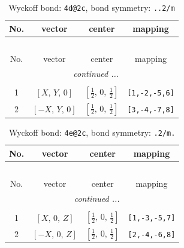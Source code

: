\documentclass[fleqn,8pt]{jsarticle}
\begin{document}
\begin{longtable}{cccc}
\caption{Wyckoff bond: {\tt 4d@2c}, bond symmetry: {\tt ..2/m}}
 \\
 \hline \hline
No. & vector & center & mapping \\ \hline \endfirsthead

\multicolumn{3}{l}{\tablename\ \thetable{}} \\
 \hline \hline
No. & vector & center & mapping \\ \hline \endhead

 \hline \hline
\multicolumn{3}{r}{\footnotesize\it continued ...} \\ \endfoot

 \hline \hline
\multicolumn{3}{r}{} \\ \endlastfoot

1 & $\left[ X,\, Y,\, 0 \right]$ & $\left[ \frac{1}{2},\, 0,\, \frac{1}{2} \right]$ & {\tt [1,-2,-5,6]} \\ \hline
2 & $\left[ - X,\, Y,\, 0 \right]$ & $\left[ \frac{1}{2},\, 0,\, \frac{1}{2} \right]$ & {\tt [3,-4,-7,8]} \\
\end{longtable}
\renewcommand{\arraystretch}{1.2}
\begin{longtable}{cccc}
\caption{Wyckoff bond: {\tt 4e@2c}, bond symmetry: {\tt .2/m.}}
 \\
 \hline \hline
No. & vector & center & mapping \\ \hline \endfirsthead

\multicolumn{3}{l}{\tablename\ \thetable{}} \\
 \hline \hline
No. & vector & center & mapping \\ \hline \endhead

 \hline \hline
\multicolumn{3}{r}{\footnotesize\it continued ...} \\ \endfoot

 \hline \hline
\multicolumn{3}{r}{} \\ \endlastfoot

1 & $\left[ X,\, 0,\, Z \right]$ & $\left[ \frac{1}{2},\, 0,\, \frac{1}{2} \right]$ & {\tt [1,-3,-5,7]} \\ \hline
2 & $\left[ - X,\, 0,\, Z \right]$ & $\left[ \frac{1}{2},\, 0,\, \frac{1}{2} \right]$ & {\tt [2,-4,-6,8]} \\
\end{longtable}
\renewcommand{\arraystretch}{1.2}
\end{document}

